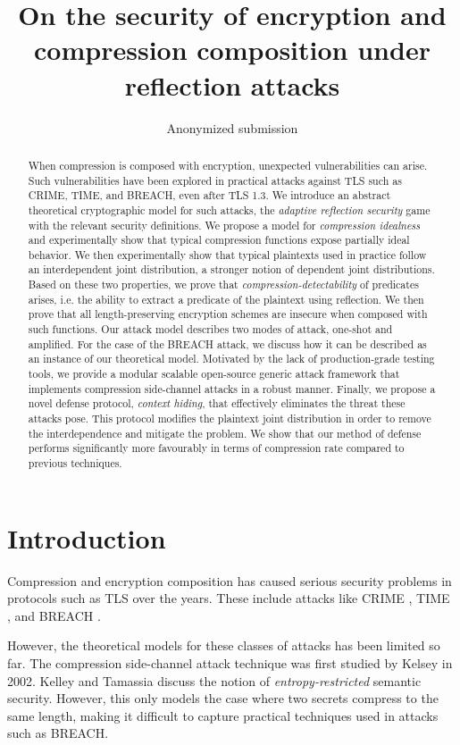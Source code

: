 \documentclass[conference, letterpaper, 10pt]{IEEEtran}
\title{On the security of encryption and compression composition under reflection attacks}
\author{
    Anonymized submission
}
\begin{document}
\maketitle

\begin{abstract}
When compression is composed with encryption, unexpected vulnerabilities can
arise. Such vulnerabilities have been explored in practical attacks against TLS
such as CRIME, TIME, and BREACH, even after TLS 1.3. We introduce an abstract
theoretical cryptographic model for such attacks, the \textit{adaptive
reflection security} game with the relevant security definitions. We propose a
model for \textit{compression idealness} and experimentally show that typical compression
functions expose partially ideal behavior. We then experimentally show that
typical plaintexts used in practice follow an interdependent joint distribution,
a stronger notion of dependent joint distributions. Based on these two
properties, we prove that \textit{compression-detectability} of predicates
arises, i.e. the ability to extract a predicate of the plaintext using reflection.
We then prove that all length-preserving encryption schemes are insecure when
composed with such functions. Our attack model describes two modes of attack,
one-shot and amplified. For the case of the BREACH attack, we discuss how it can
be described as an instance of our theoretical model. Motivated by the lack of
production-grade testing tools, we provide a modular scalable open-source
generic attack framework that implements compression side-channel attacks in a
robust manner. Finally, we propose a novel defense protocol, \textit{context
hiding}, that effectively eliminates the threat these attacks pose. This
protocol modifies the plaintext joint distribution in order to remove the
interdependence and mitigate the problem. We show that our method of
defense performs significantly more favourably in terms of compression rate
compared to previous techniques.
\end{abstract}

\section{Introduction}\label{sec:prev}

Compression and encryption composition has caused serious security problems
in protocols such as TLS \cite{c15} over the years. These
include attacks like CRIME \cite{c1}, TIME \cite{c2}, and BREACH \cite{c3}.

However, the theoretical models for these classes of attacks has been limited so
far.
The compression side-channel attack technique was first studied by Kelsey \cite{c4} in 2002.
Kelley and Tamassia\cite{c5} discuss the notion of \textit{entropy-restricted} semantic
security. However, this only models the case where two secrets compress to the same
length, making it difficult to capture practical techniques used in attacks
such as BREACH.
\end{document}
